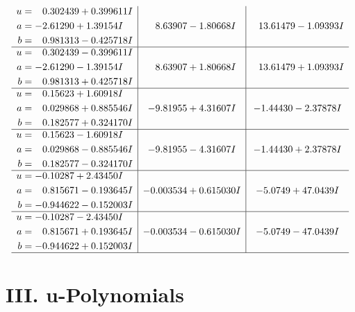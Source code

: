 \documentclass[1p]{elsarticle_modified}
\theoremstyle{definition}
\begin{document}
$$\begin{array}{c|c|c}
\begin{aligned}
u &= \phantom{-}0.302439 + 0.399611 I \\
a &= -2.61290 + 1.39154 I \\
b &= \phantom{-}0.981313 - 0.425718 I\end{aligned}
 & \phantom{-}8.63907 - 1.80668 I & \phantom{-}13.61479 - 1.09393 I \\ \hline\begin{aligned}
u &= \phantom{-}0.302439 - 0.399611 I \\
a &= -2.61290 - 1.39154 I \\
b &= \phantom{-}0.981313 + 0.425718 I\end{aligned}
 & \phantom{-}8.63907 + 1.80668 I & \phantom{-}13.61479 + 1.09393 I \\ \hline\begin{aligned}
u &= \phantom{-}0.15623 + 1.60918 I \\
a &= \phantom{-}0.029868 + 0.885546 I \\
b &= \phantom{-}0.182577 + 0.324170 I\end{aligned}
 & -9.81955 + 4.31607 I & -1.44430 - 2.37878 I \\ \hline\begin{aligned}
u &= \phantom{-}0.15623 - 1.60918 I \\
a &= \phantom{-}0.029868 - 0.885546 I \\
b &= \phantom{-}0.182577 - 0.324170 I\end{aligned}
 & -9.81955 - 4.31607 I & -1.44430 + 2.37878 I \\ \hline\begin{aligned}
u &= -0.10287 + 2.43450 I \\
a &= \phantom{-}0.815671 - 0.193645 I \\
b &= -0.944622 - 0.152003 I\end{aligned}
 & -0.003534 + 0.615030 I & -5.0749 + 47.0439 I \\ \hline\begin{aligned}
u &= -0.10287 - 2.43450 I \\
a &= \phantom{-}0.815671 + 0.193645 I \\
b &= -0.944622 + 0.152003 I\end{aligned}
 & -0.003534 - 0.615030 I & -5.0749 - 47.0439 I\\
 \hline 
 \end{array}$$\newpage
\newpage\renewcommand{\arraystretch}{1}
\centering \section*{ III. u-Polynomials}
\end{document}
